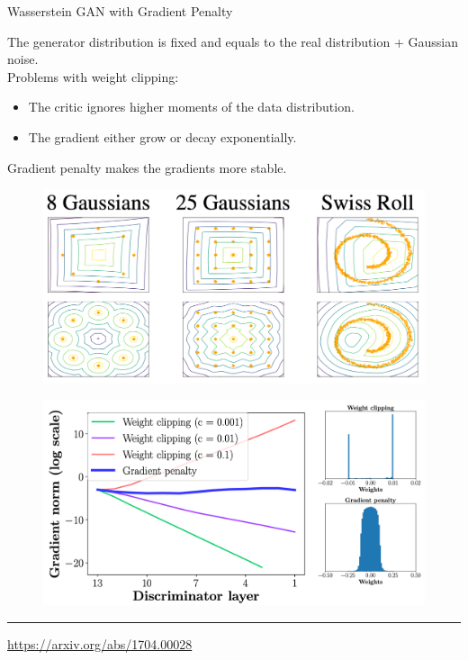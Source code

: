 \documentclass{beamer}
\begin{document}
\begin{frame}{Wasserstein GAN with Gradient Penalty}
	
	\begin{minipage}[t]{0.45\columnwidth}
		\vspace{0.2cm}
		The generator distribution is fixed and equals to the real distribution + Gaussian noise. \\
		Problems with weight clipping:
		\begin{itemize}
			\item The critic ignores higher moments of the data distribution.
			\item The gradient either grow or decay exponentially.
		\end{itemize}
	Gradient penalty makes the gradients  more stable.
	\end{minipage}%
	\begin{minipage}[t]{0.52\columnwidth}
		\begin{figure}
			\centering
			\includegraphics[width=0.95\linewidth]{figs/wgan_gp_toy}
		\end{figure}
		\begin{figure}
			\centering
			\includegraphics[width=0.95\linewidth]{figs/wgan_gp_weights}
		\end{figure}
	\end{minipage}
	
	\vfill
	\hrule\medskip 
	{\scriptsize \href{https://arxiv.org/abs/1704.00028}{https://arxiv.org/abs/1704.00028}}
	
\end{frame}
\end{document}
